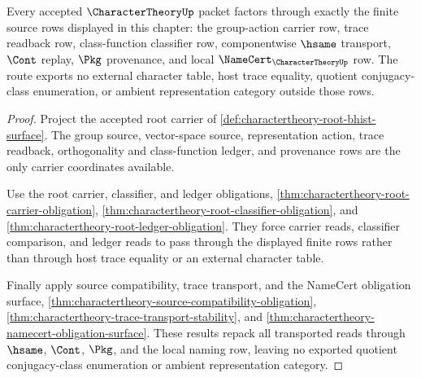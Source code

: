 \begin{theorem}
\label{thm:charactertheory-scoped-source-route}
Every accepted $\CharacterTheoryUp$ packet factors through exactly the finite source rows displayed in this chapter: the group-action carrier row, trace readback row, class-function classifier row, componentwise $\hsame$ transport, $\Cont$ replay, $\Pkg$ provenance, and local $\NameCert_{\CharacterTheoryUp}$ row. The route exports no external character table, host trace equality, quotient conjugacy-class enumeration, or ambient representation category outside those rows.
\end{theorem}
\begin{proof}
Project the accepted root carrier of \autoref{def:charactertheory-root-bhist-surface}. The group source, vector-space source, representation action, trace readback, orthogonality and class-function ledger, and provenance rows are the only carrier coordinates available.

Use the root carrier, classifier, and ledger obligations, \autoref{thm:charactertheory-root-carrier-obligation}, \autoref{thm:charactertheory-root-classifier-obligation}, and \autoref{thm:charactertheory-root-ledger-obligation}. They force carrier reads, classifier comparison, and ledger reads to pass through the displayed finite rows rather than through host trace equality or an external character table.

Finally apply source compatibility, trace transport, and the NameCert obligation surface, \autoref{thm:charactertheory-source-compatibility-obligation}, \autoref{thm:charactertheory-trace-transport-stability}, and \autoref{thm:charactertheory-namecert-obligation-surface}. These results repack all transported reads through $\hsame$, $\Cont$, $\Pkg$, and the local naming row, leaving no exported quotient conjugacy-class enumeration or ambient representation category.
\end{proof}

